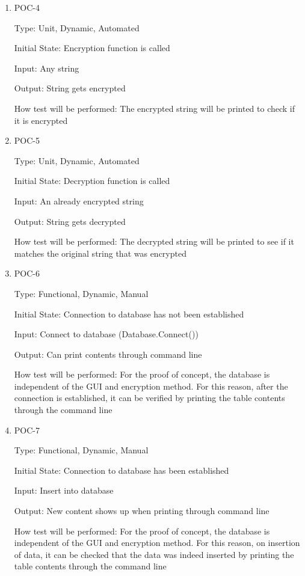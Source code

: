 \documentclass[12pt, titlepage]{article}
\begin{document}
\begin{enumerate}
\item{POC-4\\}

Type: Unit, Dynamic, Automated

Initial State: Encryption function is called

Input: Any string

Output: String gets encrypted

How test will be performed: The encrypted string will be printed to check if it is encrypted

\item{POC-5\\}

Type: Unit, Dynamic, Automated

Initial State: Decryption function is called

Input: An already encrypted string

Output: String gets decrypted

How test will be performed: The decrypted string will be printed to see if it matches the original string that was encrypted

\item{POC-6\\}

Type: Functional, Dynamic, Manual

Initial State: Connection to database has not been established

Input: Connect to database (Database.Connect())

Output: Can print contents through command line

How test will be performed: For the proof of concept, the database is independent of the GUI and encryption method. For this reason, after the connection is established, it can be verified by printing the table contents through the command line

\item{POC-7\\}

Type: Functional, Dynamic, Manual

Initial State: Connection to database has been established

Input: Insert into database

Output: New content shows up when printing through command line

How test will be performed: For the proof of concept, the database is independent of the GUI and encryption method. For this reason, on insertion of data, it can be checked that the data was indeed inserted by printing the table contents through the command line

\end{enumerate}
\end{document}
